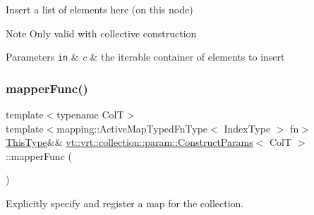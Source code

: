 Insert a list of elements here (on this node) 

\begin{DoxyNote}{Note}
Only valid with collective construction
\end{DoxyNote}

\begin{DoxyParams}[1]{Parameters}
\mbox{\tt in}  & {\em c} & the iterable container of elements to insert \\
\hline
\end{DoxyParams}
\mbox{\label{structvt_1_1vrt_1_1collection_1_1param_1_1_construct_params_af1b7987a920abbb7bed2cc49e4cfb85e}} 
\subsubsection{\texorpdfstring{mapper\+Func()}{mapperFunc()}}
{\footnotesize\ttfamily template$<$typename ColT$>$ \\
template$<$mapping\+::\+Active\+Map\+Typed\+Fn\+Type$<$ Index\+Type $>$ fn$>$ \\
\hyperlink{structvt_1_1vrt_1_1collection_1_1param_1_1_construct_params_a13d4910c0f6825c7b0ddfebce5288bea}{This\+Type}\&\& \hyperlink{structvt_1_1vrt_1_1collection_1_1param_1_1_construct_params}{vt\+::vrt\+::collection\+::param\+::\+Construct\+Params}$<$ ColT $>$\+::mapper\+Func (\begin{DoxyParamCaption}{ }\end{DoxyParamCaption})\hspace{0.3cm}{\ttfamily [inline]}}



Explicitly specify and register a map for the collection. 

\mbox{\label{structvt_1_1vrt_1_1collection_1_1param_1_1_construct_params_a6e8498d29e4daaade3e4cb4b6dfa05de}} 
